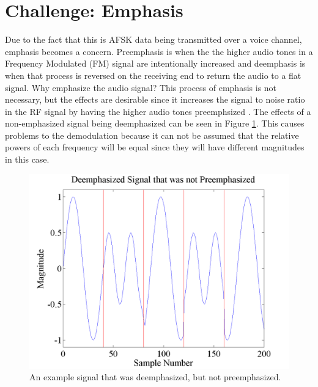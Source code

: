 \section{Challenge: Emphasis}
Due to the fact that this is AFSK data being transmitted over a voice channel, emphasis becomes a concern. Preemphasis is when the the higher audio tones in a Frequency Modulated (FM) signal are intentionally increased and deemphasis is when that process is reversed on the receiving end to return the audio to a flat signal. Why emphasize the audio signal? This process of emphasis is not necessary, but the effects are desirable since it increases the signal to noise ratio in the RF signal by having the higher audio tones preemphsized \cite{Gibilisco1994}. The effects of a non-emphasized signal being deemphasized can be seen in Figure \ref{emphasisExample}. This causes problems to the demodulation because it can not be assumed that the relative powers of each frequency will be equal since they will have different magnitudes in this case. 
\begin{figure}
  \centering
	\includegraphics[width=0.75\linewidth]{images/DeemphasizedSignalthatwasnotPreemphasized.png} 
	\caption{An example signal that was deemphasized, but not preemphasized.}
   \label{emphasisExample}
\end{figure}
